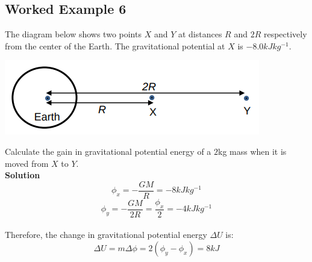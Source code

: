 \documentclass{article}
\begin{document}
\subsection*{Worked Example 6}
The diagram below shows two points $X$ and $Y$ at distances $R$ and $2R$ respectively from the center of the Earth. The gravitational potential at $X$ is $-8.0kJ kg^{-1}$.
\begin{center}
    \includegraphics[scale=0.6]{assets/ex6.png}
\end{center}\leavevmode
Calculate the gain in gravitational potential energy of a $2$kg mass when it is moved from $X$ to $Y$.
\pagebreak
\\\textbf{Solution}
\begin{equation}
    \phi_x=-\frac{GM}{R}=-8kJkg^{-1}
\end{equation}
\begin{equation}
    \phi_y=-\frac{GM}{2R}=\frac{\phi_x}{2}=-4kJkg^{-1}
\end{equation}
\\
Therefore, the change in gravitational potential energy $\Delta U$ is:
\begin{equation}
    \Delta U=m\Delta\phi=2(\phi_y - \phi_x)=8kJ
\end{equation}
\\
\end{document}
